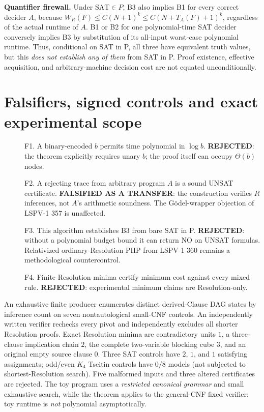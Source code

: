 \documentclass[11pt]{article}
\begin{document}
\textbf{Quantifier firewall.} Under $\mathrm{SAT}\in P$, B3 also implies B1 for every correct decider $A$, because $W_R(F)\le C(N+1)^k\le C(N+T_A(F)+1)^k$, regardless of the actual runtime of $A$. B1 or B2 for one polynomial-time SAT decider conversely implies B3 by substitution of its all-input worst-case polynomial runtime. Thus, conditional on SAT in P, all three have equivalent truth values, but this \emph{does not establish any of them} from SAT in P. Proof existence, effective acquisition, and arbitrary-machine decision cost are not equated unconditionally.

\section*{Falsifiers, signed controls and exact experimental scope}
\begin{description}
\item[] F1. A binary-encoded $b$ permits time polynomial in $\log b$. \textbf{REJECTED}: the theorem explicitly requires unary $b$; the proof itself can occupy $\Theta(b)$ nodes.
\item[] F2. A rejecting trace from arbitrary program $A$ is a sound UNSAT certificate. \textbf{FALSIFIED AS A TRANSFER}: the construction verifies $R$ inferences, not $A$'s arithmetic soundness. The Gödel-wrapper objection of LSPV-1 357 is unaffected.
\item[] F3. This algorithm establishes B3 from bare SAT in P. \textbf{REJECTED}: without a polynomial budget bound it can return NO on UNSAT formulas. Relativized ordinary-Resolution PHP from LSPV-1 360 remains a methodological countercontrol.
\item[] F4. Finite Resolution minima certify minimum cost against every mixed rule. \textbf{REJECTED}: experimental minimum claims are Resolution-only.
\end{description}
An exhaustive finite producer enumerates distinct derived-Clause DAG states by inference count on seven nontautological small-CNF controls. An independently written verifier rechecks every pivot and independently excludes all shorter Resolution proofs. Exact Resolution minima are contradictory units $1$, a three-clause implication chain $2$, the complete two-variable blocking cube $3$, and an original empty source clause $0$. Three SAT controls have $2$, $1$, and $1$ satisfying assignments; odd/even $K_4$ Tseitin controls have $0/8$ models (not subjected to shortest-Resolution search). Five malformed inputs and three altered certificates are rejected. The toy program uses a \emph{restricted canonical grammar} and small exhaustive search, while the theorem applies to the general-CNF fixed verifier; toy runtime is \emph{not} polynomial asymptotically.
\end{document}
